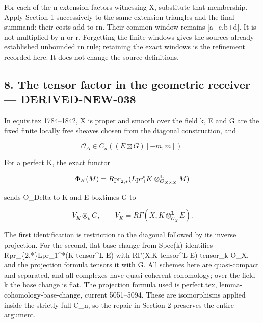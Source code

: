 For each of the n extension factors witnessing X,\allowbreak{} substitute that membership. Apply Section 1 successively to the same extension triangles and the final summand:\allowbreak{} their costs add to rn. Their common window remains [a\allowbreak{}+c,\allowbreak{}b\allowbreak{}+d]\allowbreak{}. It is not multiplied by n or r. Forgetting the finite windows gives the source\textquotesingle s already established unbounded rn rule; retaining the exact windows is the refinement recorded here. It does not change the source definitions.

\subsection{8. The tensor factor in the geometric receiver --- DERIVED-NEW-038}\label{proofs-10691-11108-the-tensor-factor-in-the-geometric-receiver-derived-new-038}

In equiv.tex 1784–\allowbreak{}1842,\allowbreak{} X is proper and smooth over the field k,\allowbreak{} E and G are the fixed finite locally free sheaves chosen from the diagonal construction,\allowbreak{} and

\[
 \mathcal O_\Delta\in C_n((E\boxtimes G)[-m,m]).
\]

For a perfect K,\allowbreak{} the exact functor

\[
 \Phi_K(M)=R{\rm pr}_{2,*}(L{\rm pr}_1^*K
                   \otimes_{\mathcal O_{X\times X}}^{\mathbf L}M)
\]

sends O\_\allowbreak{}Delta to K and E boxtimes G to

\[
 V_K\otimes_k G,\qquad
 V_K=R\Gamma(X,K\otimes_{\mathcal O_X}^{\mathbf L}E).
\]

The first identification is restriction to the diagonal followed by its inverse projection. For the second,\allowbreak{} flat base change from Spec(k)\allowbreak{} identifies Rpr\_\allowbreak{}\{2,\allowbreak{}*\}Lpr\_\allowbreak{}1\textasciicircum{}*(K tensor\^{}L E)\allowbreak{} with RΓ(X,\allowbreak{}K tensor\^{}L E)\allowbreak{} tensor\_\allowbreak{}k O\_\allowbreak{}X,\allowbreak{} and the projection formula tensors it with G. All schemes here are quasi-compact and separated,\allowbreak{} and all complexes have quasi-coherent cohomology; over the field k the base change is flat. The projection formula used is perfect.tex,\allowbreak{} lemma-cohomology-base-change,\allowbreak{} current 5051–\allowbreak{}5094. These are isomorphisms applied inside the strictly full C\_\allowbreak{}n,\allowbreak{} so the repair in Section 2 preserves the entire argument.

